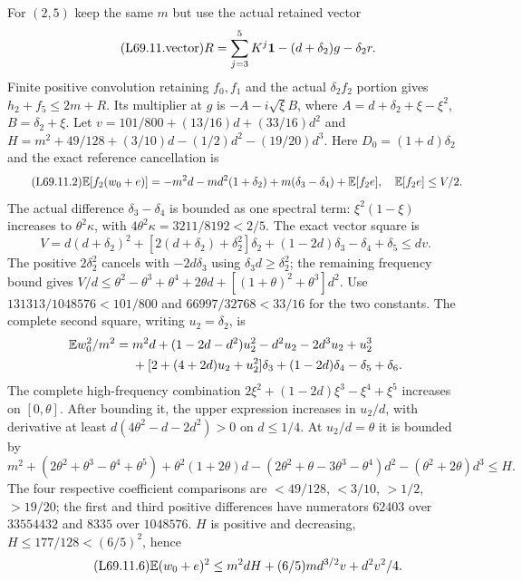 For $(2,5)$ keep the same $m$ but use the actual retained vector
\begin{equation}\tag{L69.11.vector}\label{eq:L69:fivevector}
R=\sum_{j=3}^5K^j\mathbf1-(d+\delta_2)g-\delta_2r.
\end{equation}
Finite positive convolution retaining $f_0,f_1$ and the actual
$\delta_2f_2$ portion gives $h_2+f_5\le2m+R$.
Its multiplier at $g$ is $-A-i\sqrt\xi B$, where
$A=d+\delta_2+\xi-\xi^2$, $B=\delta_2+\xi$.
Let $v=101/800+(13/16)d+(33/16)d^2$ and
$H=m^2+49/128+(3/10)d-(1/2)d^2-(19/20)d^3$.
Here $D_0=(1+d)\delta_2$ and the exact reference cancellation is
\begin{equation}\tag{L69.11.2}\label{eq:L69:fivefirst}
\mathbb E[f_2(w_0+e)]=-m^2d-md^2(1+\delta_2)
+m(\delta_3-\delta_4)+\mathbb E[f_2e],\quad\mathbb E[f_2e]\le V/2.
\end{equation}
The actual difference $\delta_3-\delta_4$ is bounded as one spectral
term: $\xi^2(1-\xi)$ increases to $\theta^2\kappa$, with
$4\theta^2\kappa=3211/8192<2/5$.
The exact vector square is
\[
V=d(d+\delta_2)^2+[2(d+\delta_2)+\delta_2^2]\delta_2
+(1-2d)\delta_3-\delta_4+\delta_5\le dv.
\]
The positive $2\delta_2^2$ cancels with $-2d\delta_3$ using
$\delta_3d\ge\delta_2^2$; the remaining frequency bound gives
$V/d\le\theta^2-\theta^3+\theta^4+2\theta d
+[(1+\theta)^2+\theta^3]d^2$.
Use $131313/1048576<101/800$ and
$66997/32768<33/16$ for the two constants.
The complete second square, writing $u_2=\delta_2$, is
\begin{align*}
\mathbb E w_0^2/m^2={}&m^2d+(1-2d-d^2)u_2^2-d^2u_2-2d^3u_2+u_2^3\\
&+[2+(4+2d)u_2+u_2^2]\delta_3+(1-2d)\delta_4-\delta_5+\delta_6.
\end{align*}
The complete high-frequency combination
$2\xi^2+(1-2d)\xi^3-\xi^4+\xi^5$ increases on $[0,\theta]$.
After bounding it, the upper expression increases in $u_2/d$,
with derivative at least $d(4\theta^2-d-2d^2)>0$ on $d\le1/4$.
At $u_2/d=\theta$ it is bounded by
\[
m^2+(2\theta^2+\theta^3-\theta^4+\theta^5)
+\theta^2(1+2\theta)d
-(2\theta^2+\theta-3\theta^3-\theta^4)d^2
-(\theta^2+2\theta)d^3\le H.
\]
The four respective coefficient comparisons are $<49/128$,
$<3/10$, $>1/2$, $>19/20$; the first and third positive differences
have numerators $62403$ over $33554432$ and $8335$ over $1048576$.
$H$ is positive and decreasing, $H\le177/128<(6/5)^2$, hence
\begin{equation}\tag{L69.11.6}\label{eq:L69:fivevariance}
\mathbb E(w_0+e)^2\le m^2dH+(6/5)md^{3/2}v+d^2v^2/4.
\end{equation}

